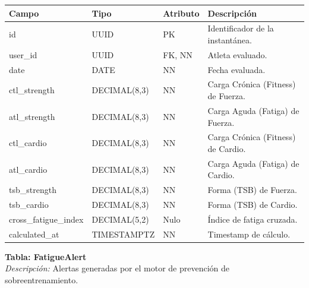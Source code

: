 \documentclass[12pt]{article}
\begin{document}
\begin{table}[h!]
    \centering
    \renewcommand{\arraystretch}{1.2}
    \small
    \begin{tabular}{|p{3.5cm}|p{2.7cm}|p{2cm}|p{6.5cm}|}
        \hline
        \rowcolor[HTML]{EFEFEF}
        \textbf{Campo} & \textbf{Tipo} & \textbf{Atributo} & \textbf{Descripción} \\ \hline
        id & UUID & PK & Identificador de la instantánea. \\ \hline
        user\_id & UUID & FK, NN & Atleta evaluado. \\ \hline
        date & DATE & NN & Fecha evaluada. \\ \hline
        ctl\_strength & DECIMAL(8,3) & NN & Carga Crónica (Fitness) de Fuerza. \\ \hline
        atl\_strength & DECIMAL(8,3) & NN & Carga Aguda (Fatiga) de Fuerza. \\ \hline
        ctl\_cardio & DECIMAL(8,3) & NN & Carga Crónica (Fitness) de Cardio. \\ \hline
        atl\_cardio & DECIMAL(8,3) & NN & Carga Aguda (Fatiga) de Cardio. \\ \hline
        tsb\_strength & DECIMAL(8,3) & NN & Forma (TSB) de Fuerza. \\ \hline
        tsb\_cardio & DECIMAL(8,3) & NN & Forma (TSB) de Cardio. \\ \hline
        cross\_fatigue\_index & DECIMAL(5,2) & Nulo & Índice de fatiga cruzada. \\ \hline
        calculated\_at & TIMESTAMPTZ & NN & Timestamp de cálculo. \\ \hline
    \end{tabular}
\end{table}
\newpage
\noindent\textbf{Tabla: FatigueAlert} \\
\textit{Descripción:} Alertas generadas por el motor de prevención de sobreentrenamiento.
\end{document}
